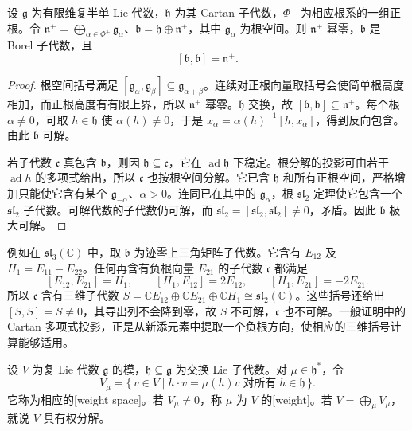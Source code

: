 \begin{proposition}\label{b5:prop:positive-borel}
	设 \(\mathfrak g\) 为有限维复半单 Lie 代数，\(\mathfrak h\) 为其 Cartan 子代数，\(\Phi^+\) 为相应根系的一组正根。令 \(\mathfrak n^+=\bigoplus_{\alpha\in\Phi^+}\mathfrak g_\alpha\)、\(\mathfrak b=\mathfrak h\oplus\mathfrak n^+\)，其中 \(\mathfrak g_\alpha\) 为根空间。则 \(\mathfrak n^+\) 幂零，\(\mathfrak b\) 是 Borel 子代数，且
	\[
		[\mathfrak b,\mathfrak b]=\mathfrak n^+.
	\]
\end{proposition}
\begin{proof}
	根空间括号满足 \([\mathfrak g_\alpha,\mathfrak g_\beta]\subseteq\mathfrak g_{\alpha+\beta}\)。连续对正根向量取括号会使简单根高度相加，而正根高度有有限上界，所以 \(\mathfrak n^+\) 幂零。\(\mathfrak h\) 交换，故 \([\mathfrak b,\mathfrak b]\subseteq\mathfrak n^+\)。每个根 \(\alpha\ne0\)，可取 \(h\in\mathfrak h\) 使 \(\alpha(h)\ne0\)，于是 \(x_\alpha=\alpha(h)^{-1}[h,x_\alpha]\)，得到反向包含。由此 \(\mathfrak b\) 可解。

	若子代数 \(\mathfrak c\) 真包含 \(\mathfrak b\)，则因 \(\mathfrak h\subseteq\mathfrak c\)，它在 \(\operatorname{ad}\mathfrak h\) 下稳定。根分解的投影可由若干 \(\operatorname{ad}h\) 的多项式给出，所以 \(\mathfrak c\) 也按根空间分解。它已含 \(\mathfrak h\) 和所有正根空间，严格增加只能使它含有某个 \(\mathfrak g_{-\alpha}\)、\(\alpha>0\)。连同已在其中的 \(\mathfrak g_\alpha\)，根 \(\mathfrak{sl}_2\) 定理使它包含一个 \(\mathfrak{sl}_2\) 子代数。可解代数的子代数仍可解，而 \(\mathfrak{sl}_2=[\mathfrak{sl}_2,\mathfrak{sl}_2]\ne0\)，矛盾。因此 \(\mathfrak b\) 极大可解。
\end{proof}

例如在 \(\mathfrak{sl}_3(\mathbb C)\) 中，取 \(\mathfrak b\) 为迹零上三角矩阵子代数。它含有 \(E_{12}\) 及 \(H_1=E_{11}-E_{22}\)。任何再含有负根向量 \(E_{21}\) 的子代数 \(\mathfrak c\) 都满足
\[
	[E_{12},E_{21}]=H_1,\qquad [H_1,E_{12}]=2E_{12},\qquad [H_1,E_{21}]=-2E_{21}.
\]
所以 \(\mathfrak c\) 含有三维子代数 \(S=\mathbb CE_{12}\oplus\mathbb CE_{21}\oplus\mathbb CH_1\cong\mathfrak{sl}_2(\mathbb C)\)。这些括号还给出 \([S,S]=S\ne0\)，其导出列不会降到零，故 \(S\) 不可解，\(\mathfrak c\) 也不可解。一般证明中的 Cartan 多项式投影，正是从新添元素中提取一个负根方向，使相应的三维括号计算能够适用。

\begin{definition}\label{b5:def:lie-weight-space}
	设 \(V\) 为复 Lie 代数 \(\mathfrak g\) 的模，\(\mathfrak h\subseteq\mathfrak g\) 为交换 Lie 子代数。对 \(\mu\in\mathfrak h^*\)，令
	\[
		V_\mu=\bigl\{\,v\in V\mid h\cdot v=\mu(h)v\;\text{对所有}\;h\in\mathfrak h\,\bigr\}.
	\]
	它称为相应的[weight space]。若 \(V_\mu\ne0\)，称 \(\mu\) 为 \(V\) 的[weight]。若 \(V=\bigoplus_\mu V_\mu\)，就说 \(V\) 具有权分解。
\end{definition}

